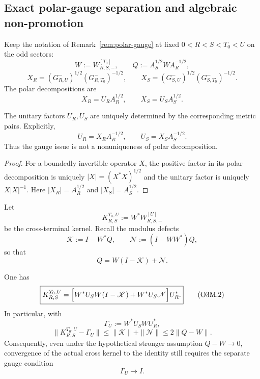 
\subsection{Exact polar-gauge separation and algebraic non-promotion}\label{subsec:o3m-polar-gauge}

Keep the notation of Remark~\ref{rem:polar-gauge} at fixed
$0<R<S<T_0<U$ on the odd sectors:
\[
 W:=W_{R,S,-}^{[T_0]},
 \qquad
 Q:=A_S^{1/2}WA_R^{-1/2},
\]
\[
 X_R=(G_{R,U}^-)^{1/2}(G_{R,T_0}^-)^{-1/2},
 \qquad
 X_S=(G_{S,U}^-)^{1/2}(G_{S,T_0}^-)^{-1/2}.
\]
The polar decompositions are
\[
 X_R=U_RA_R^{1/2},
 \qquad
 X_S=U_SA_S^{1/2}.
\]

\begin{proposition}\label{prop:o3m-polar-unique}
The unitary factors $U_R,U_S$ are uniquely determined by the corresponding metric
pairs.  Explicitly,
\[
 \boxed{
 U_R=X_RA_R^{-1/2},
 \qquad
 U_S=X_SA_S^{-1/2}.
 }
\tag{O3M.1}\label{eq:o3m-polar-unique}
\]
Thus the gauge issue is not a nonuniqueness of polar decomposition.
\end{proposition}

\begin{proof}
For a boundedly invertible operator $X$, the positive factor in its polar decomposition
is uniquely $|X|=(X^*X)^{1/2}$ and the unitary factor is uniquely
$X|X|^{-1}$.  Here $|X_R|=A_R^{1/2}$ and $|X_S|=A_S^{1/2}$.
\end{proof}

Let
\[
 K_{R,S}^{T_0,U}:=W^*W_{R,S,-}^{[U]}
\]
be the cross-terminal kernel.  Recall the modulus defects
\[
 \mathscr K:=I-W^*Q,
 \qquad
 \mathscr N:=(I-WW^*)Q,
\]
so that
\[
 Q=W(I-\mathscr K)+\mathscr N.
\]

\begin{proposition}
\label{prop:o3m-cross-separation}
One has
\[
 \boxed{
 K_{R,S}^{T_0,U}
 =\Bigl[W^*U_SW(I-\mathscr K)+W^*U_S\mathscr N\Bigr]U_R^*.
 }
\tag{O3M.2}\label{eq:o3m-cross-separation}
\]
In particular, with
\[
 \Gamma_U:=W^*U_SWU_R^*,
\]
\[
 \boxed{
 \|K_{R,S}^{T_0,U}-\Gamma_U\|
 \le \|\mathscr K\|+\|\mathscr N\|
 \le 2\|Q-W\|.
 }
\tag{O3M.3}\label{eq:o3m-gauge-error}
\]
Consequently, even under the hypothetical stronger assumption $Q-W\to0$, convergence
of the actual cross kernel to the identity still requires the separate gauge condition
\[
 \Gamma_U\to I.
\]
\end{proposition}

